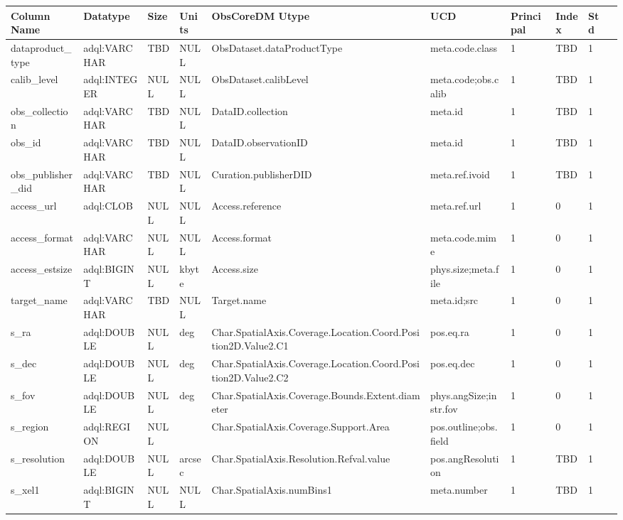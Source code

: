 \documentclass[11pt,a4paper]{ivoa}
\begin{document}
\begin{tabular}{|l|p{}|p{}|p{}|p{}|
  p{}|p{}|p{}|p{}|p{}|}
\hline
Column Name & Datatype & Size & Units & ObsCoreDM Utype & UCD & Principal & Index & Std\\\hline
dataproduct\_type &
adql:VARCHAR &
TBD &
NULL &
ObsDataset.dataProductType &
meta.code.class &
1 &
TBD &
1\\\hline
calib\_level &
adql:INTEGER &
NULL &
NULL &
ObsDataset.calibLevel &
meta.code;obs.calib &
1 &
TBD &
1\\\hline
obs\_collection &
adql:VARCHAR &
TBD &
NULL &
DataID.collection &
meta.id &
1 &
TBD &
1\\\hline
obs\_id &
adql:VARCHAR &
TBD &
NULL &
DataID.observationID &
meta.id &
1 &
TBD &
1\\\hline
obs\_publisher\_did &
adql:VARCHAR &
TBD &
NULL &
Curation.publisherDID &
meta.ref.ivoid &
1 &
TBD &
1\\\hline
access\_url &
adql:CLOB &
NULL &
NULL &
Access.reference &
meta.ref.url &
1 &
0 &
1\\\hline
access\_format &
adql:VARCHAR &
NULL &
NULL &
Access.format &
meta.code.mime &
1 &
0 &
1\\\hline
access\_estsize &
adql:BIGINT &
NULL &
kbyte &
Access.size &
phys.size;meta.file &
1 &
0 &
1\\\hline
target\_name &
adql:VARCHAR &
TBD &
NULL &
Target.name &
meta.id;src &
1 &
0 &
1\\\hline
s\_ra &
adql:DOUBLE &
NULL &
deg &
Char.SpatialAxis.Coverage.Location.Coord.Position2D.Value2.C1 &
pos.eq.ra &
1 &
0 &
1\\\hline
s\_dec &
adql:DOUBLE &
NULL &
deg &
Char.SpatialAxis.Coverage.Location.Coord.Position2D.Value2.C2 &
pos.eq.dec &
1 &
0 &
1\\\hline
s\_fov &
adql:DOUBLE &
NULL &
deg &
Char.SpatialAxis.Coverage.Bounds.Extent.diameter &
phys.angSize;instr.fov &
1 &
0 &
1\\\hline
s\_region &
adql:REGION &
NULL &
 &
Char.SpatialAxis.Coverage.Support.Area &
pos.outline;obs.field &
1 &
0 &
1\\\hline
s\_resolution &
adql:DOUBLE &
NULL &
arcsec &
Char.SpatialAxis.Resolution.Refval.value &
pos.angResolution &
1 &
TBD &
1\\\hline
s\_xel1 &
adql:BIGINT &
NULL &
NULL &
Char.SpatialAxis.numBins1 &
meta.number &
1 &
TBD &
1\\\hline

\end{tabular}
\end{document}
